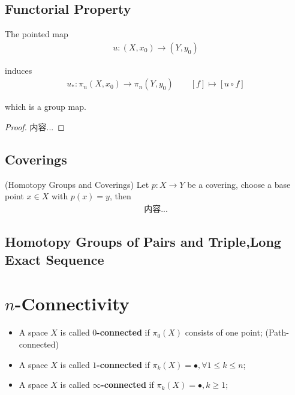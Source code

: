 \documentclass[Total.tex]{subfiles}
\begin{document}
			\subsection{Functorial Property}
			\begin{proposition}
				The pointed map 
				\begin{gather*}
					u:(X,x_0)\rightarrow (Y,y_0)
				\end{gather*}
				
				induces 
				\begin{gather*}
					u_*:\pi_n(X,x_0)\rightarrow \pi_n(Y,y_0)\qquad [f]\mapsto [u\circ f]
				\end{gather*}
				
				which is a group map. 
			\end{proposition}
			\begin{proof}
				内容...
			\end{proof}
			\subsection{Coverings}
			
			\begin{theorem}
				(Homotopy Groups and Coverings) Let $p:X\rightarrow Y$ be a covering, choose a base point $x\in X$ with $p(x)=y$, then
				\begin{gather*}
					内容...
				\end{gather*}
			\end{theorem}
			\subsection{Homotopy Groups of Pairs and Triple,Long Exact Sequence}
		\section{$n$-Connectivity}
			\begin{Def}
				\begin{itemize}
					\item A space $X$ is called \textbf{$0$-connected} if $\pi_0(X)$ consists of one point; (Path-connected)
					\item A space $X$ is called \textbf{$1$-connected} if $\pi_k(X)=\bullet,\forall 1\leq k\leq n$;
					\item A space $X$ is called \textbf{$\infty$-connected} if $\pi_k(X)=\bullet,k\geq 1$;
				\end{itemize}
			\end{Def}
			
\end{document}
